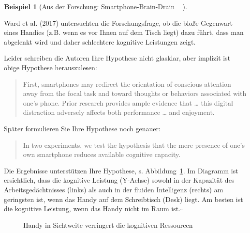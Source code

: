 \documentclass[
  a4paper,
  DIV=11]{scrreprt}
\theoremstyle{definition}
\theoremstyle{definition}
\newtheorem{example}{Beispiel}[chapter]
\theoremstyle{definition}
\theoremstyle{remark}
\begin{document}
\begin{example}[Aus der Forschung: Smartphone-Brain-Drain
📱🧠🚫]\protect\hypertarget{exm-braindrain}{}\label{exm-braindrain}

Ward et al. (2017) untersuchten die Forschungsfrage, ob die bloße
Gegenwart eines Handies (z.B. wenn es vor Ihnen auf dem Tisch liegt)
dazu führt, dass man abgelenkt wird und daher schlechtere kognitive
Leistungen zeigt.

Leider schreiben die Autoren Ihre Hypothese nicht glasklar, aber
implizit ist obige Hypothese herauszulesen:

\begin{quote}
First, smartphones may redirect the orientation of conscious attention
away from the focal task and toward thoughts or behaviors associated
with one's phone. Prior research provides ample evidence that \ldots{}
this digital distraction adversely affects both performance \ldots{} and
enjoyment.
\end{quote}

Später formulieren Sie Ihre Hypothese noch genauer:

\begin{quote}
In two experiments, we test the hypothesis that the mere presence of
one's own smartphone reduces available cognitive capacity.
\end{quote}

Die Ergebnisse unterstützen Ihre Hypothese, s.
Abbildung~\ref{fig-braindrain}. Im Diagramm ist ersichtlich, dass die
kognitive Leistung (Y-Achse) sowohl in der Kapazität des
Arbeitsgedächtnisses (links) als auch in der fluiden Intelligenz
(rechts) am geringsten ist, wenn das Handy auf dem Schreibtisch (Desk)
liegt. Am besten ist die kognitive Leistung, wenn das Handy nicht im
Raum ist.\(\square\)

\begin{figure}


\caption{\label{fig-braindrain}Handy in Sichtweite verringert die
kognitiven Ressourcen}

\end{figure}%

\end{example}
\end{document}
